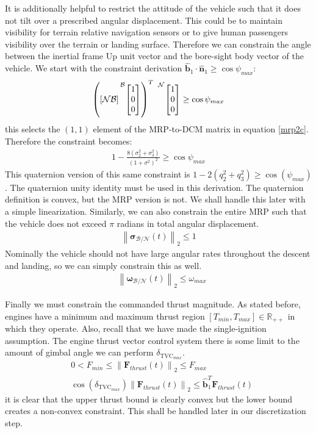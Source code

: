 It is additionally helpful to restrict the attitude of the vehicle such that it does not tilt over a prescribed angular displacement. This could be to maintain visibility for terrain relative navigation sensors or to give human passengers visibility over the terrain or landing surface. Therefore we can constrain the angle between the inertial frame Up unit vector and the bore-sight body vector of the vehicle. We start with the constraint derivation $\hat{\bm{b}}_1 \cdot \hat{\bm{n}}_1 \geq \cos{\psi_{max}}$:
\begin{align}
	\left (
	[\mathcal{NB}]
	\prescript{\mathcal{B}}{}{
	\begin{bmatrix}
		1 \\ 0 \\ 0
	\end{bmatrix}}
	\right )^T \
	\prescript{\mathcal{N}}{}{
	\begin{bmatrix}
		1 \\  0 \\ 0
	\end{bmatrix}}
	\geq \cos{\psi_{max}}
\end{align}
this selects the $(1,1)$ element of the MRP-to-DCM matrix in equation \ref{mrp2c}. Therefore the constraint becomes:
%
\begin{align}
\label{alignconstraint}
	1- \frac{8(\sigma_2^2 + \sigma_3^2)}{(1+\sigma^2)^2} \geq \cos{\psi_{max}}
\end{align}
This quaternion version of this same constraint is $1-2(q_{2}^{2}+q_{3}^{2}) \geq \cos(\psi_{max})$. The quaternion unity identity must be used in this derivation. The quaternion definition is convex, but the MRP version is not. We shall handle this later with a simple linearization. Similarly, we can also constrain the entire MRP such that the vehicle does not exceed $\pi$ radians in total angular displacement.
\begin{align}
	\left \lVert \boldsymbol{\sigma}_\mathcal{B/N} (t) \right \lVert_2 \leq 1
\end{align}
Nominally the vehicle should not have large angular rates throughout the descent and landing, so we can simply constrain this as well.
\begin{align}
& \left \lVert \bm{\omega}_\mathcal{B/N}(t) \right \lVert_2 \leq \omega_{max}
\end{align}

Finally we must constrain the commanded thrust magnitude. As stated before, engines have a minimum and maximum thrust region $[T_{min}, T_{max}] \in \mathbb{R}_{++}$ in which they operate. Also, recall that we have made the single-ignition assumption. The engine thrust vector control system there is some limit to the amount of gimbal angle we can perform $\delta_{\text{TVC}_{max}}$.
\begin{align}
& 0 < F_{min} \leq \left \lVert \bm{F}_{thrust}(t) \right \lVert_2 \leq F_{max} \\
& \cos(\delta_{\text{TVC}_{max}}) \left \lVert \bm{F}_{thrust}(t) \right \lVert_2 \leq \hat{\bm{b}}_1^T \bm{F}_{thrust}(t)
\end{align}
it is clear that the upper thrust bound is clearly convex but the lower bound creates a non-convex constraint. This shall be handled later in our discretization step.

